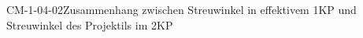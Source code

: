 
\begin{CONC}{CM-1-04-02}{Zusammenhang zwischen Streuwinkel in effektivem 1KP und Streuwinkel des Projektils im 2KP}
\end{CONC}
